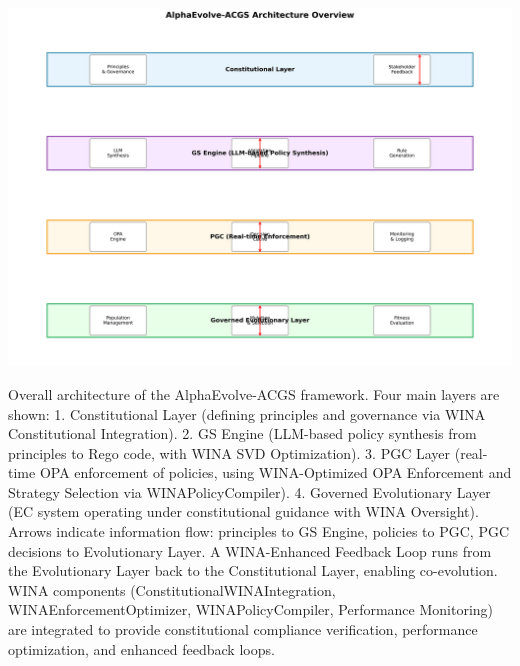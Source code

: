 \documentclass[manuscript,screen,review,anonymous,9pt]{acmart}
\begin{document}

\maketitle

\begin{teaserfigure}
	\centering
	\includegraphics[width=\textwidth,height=0.35\textheight,keepaspectratio]{architecture_overview.png}
	\caption{Overall architecture of the AlphaEvolve-ACGS framework. Four main layers are shown: 1. Constitutional Layer (defining principles and governance via WINA Constitutional Integration). 2. GS Engine (LLM-based policy synthesis from principles to Rego code, with WINA SVD Optimization). 3. PGC Layer (real-time OPA enforcement of policies, using WINA-Optimized OPA Enforcement and Strategy Selection via WINAPolicyCompiler). 4. Governed Evolutionary Layer (EC system operating under constitutional guidance with WINA Oversight). Arrows indicate information flow: principles to GS Engine, policies to PGC, PGC decisions to Evolutionary Layer. A WINA-Enhanced Feedback Loop runs from the Evolutionary Layer back to the Constitutional Layer, enabling co-evolution. WINA components (ConstitutionalWINAIntegration, WINAEnforcementOptimizer, WINAPolicyCompiler, Performance Monitoring) are integrated to provide constitutional compliance verification, performance optimization, and enhanced feedback loops.}
	\label{fig:architecture}

\end{teaserfigure}
\end{document}
